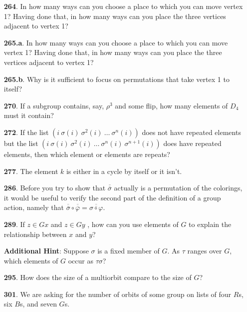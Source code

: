 \documentclass[10pt,]{book}
\theoremstyle{plain}
\theoremstyle{definition}
\theoremstyle{definition}
\numberwithin{equation}{chapter}
\begin{document}
\begin{itemize}[itemsep=1em]
\item[\textbf{264}.]In how many ways can you choose a place to which you can move vertex 1? Having done that, in how many ways can you place the three vertices adjacent to vertex 1?%

\item[\textbf{265.a}.]In how many ways can you choose a place to which you can move vertex 1? Having done that, in how many ways can you place the three vertices adjacent to vertex 1?%

\item[\textbf{265.b}.]Why is it sufficient to focus on permutations that take vertex 1 to itself?%

\item[\textbf{270}.]If a subgroup contains, say, \(\rho^3\) and some flip, how many elements of \(D_4\) must it contain?%

\item[\textbf{272}.]If the list \((i\ \sigma(i)\ \sigma^2(i)\ \ldots\ \sigma^n(i))\) does not have repeated elements but the list \((i\ \sigma(i)\ \sigma^2(i)\ \ldots\ \sigma^n(i)\ \sigma^{n+1}(i))\) does have repeated elements, then which element or elements are repeats?%

\item[\textbf{277}.]The element \(k\) is either in a cycle by itself or it isn't.%

\item[\textbf{286}.]Before you try to show that \(\overline{\overline{\sigma}}\) actually is a permutation of the colorings, it would be useful to verify the second part of the definition of a group action, namely that \(\overline{\overline{\sigma}}\circ\overline{\overline{\varphi}} = \overline{\overline{\sigma\circ\varphi}}\).%

\item[\textbf{289}.]If \(z \in Gx\) and \(z \in Gy\) , how can you use elements of \(G\) to explain the relationship between \(x\) and \(y\)?%

\par\smallskip
\noindent\textbf{Additional Hint}: Suppose \(\sigma\) is a fixed member of \(G\). As \(\tau\) ranges over \(G\), which elements of \(G\) occur as \(\tau\sigma\)?%

\item[\textbf{295}.]How does the size of a multiorbit compare to the size of \(G\)?%

\item[\textbf{301}.]We are asking for the number of orbits of some group on lists of four \(R\)s, six \(B\)s, and seven \(G\)s.%


\end{itemize}
\end{document}
